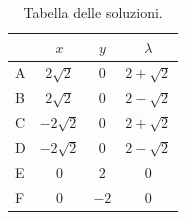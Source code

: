 \documentclass[a4paper]{article}
\begin{document}
	\begin{table}[!htp]
		\centering
		\begin{tabular}{@{} l | c | c | c @{}}
			\toprule
			& $x$ & $y$ & $\lambda$ \\
			\midrule
			A & $2\sqrt{2}$ & $0$ & $2+\sqrt{2}$ \\
			B & $2\sqrt{2}$ & $0$ & $2-\sqrt{2}$ \\
			C & $-2\sqrt{2}$ & $0$ & $2+\sqrt{2}$ \\
			D & $-2\sqrt{2}$ & $0$ & $2-\sqrt{2}$ \\
			\cmidrule{1-4}
			E & $0$  & $2$ & $0$ \\
			F & $0$  & $-2$ & $0$ \\
			\bottomrule
		\end{tabular}
		\caption*{Tabella delle soluzioni.}
	\end{table}\newpage
\end{document}
